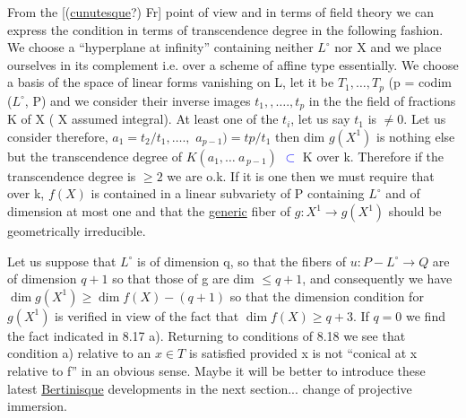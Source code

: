 \documentclass[11pt]{article}
\newcommand{\scanpage}[1]{\par\bigskip\noindent{\small\sffamily[scan #1]}\par}
\newcommand{\mspage}[1]{{\small\sffamily[p.\,#1]}}
\newcommand{\hand}[1]{\textcolor{blue}{#1}}
\newcommand{\uline}[1]{\underline{#1}}
\begin{document}
From the [(\uline{cunutesque}?) Fr] point of view and in terms of
field theory we can express the condition in terms of
transcendence degree in the following fashion.  We choose a
``hyperplane at infinity'' containing neither $L^{\circ}$ nor X and we place
ourselves in its complement i.e. over a scheme of affine type
essentially.  We choose a basis of the space of linear forms
vanishing on L, let it be $T_1, \ldots, T_p$ (p = codim ($L^{\circ}$, P) and we
consider their inverse images $t_1,, \ldots., t_p$ in the the field of
fractions K of X (  X assumed integral).  At least one of the $t_i$,
let us say $t_1$ is $\neq 0$.  Let us consider therefore, $a_1 = t_2/t_1, \ldots.,$
$a_{p-1}) = tp/t_1$ then dim $g(X^1)$ is nothing else but the transcendence
degree of $K(a_1, \ldots\ a_{\,p-1})$ \hand{$\subset$} K over k.  Therefore if the
transcendence degree is $\geq 2$ we are o.k.  If it is one then we must
require that over k, $f(X)$ is contained in a linear subvariety of P
containing $L^{\circ}$ and of dimension at most one and that the \uline{generic}
fiber of $g{:}X^1 \to g(X^1)$ should be geometrically irreducible.

\clearpage
\scanpage{24/62}
\mspage{62}

Let us suppose that $L^{\circ}$ is of dimension q, so that the fibers
of $u\colon P - L^{\circ} \to Q$ are of dimension $q + 1$ so that those of g are dim
$\leq q + 1$, and consequently we have $\dim g(X^{1}) \geq \dim f(X) - (q + 1)$ so
that the dimension condition for $g(X^{1})$ is verified in view of the
fact that $\dim f(X) \geq q + 3$. If $q = 0$ we find the fact indicated
in 8.17 a). Returning to conditions of 8.18 we see that condition
a) relative to an $x \in T$ is satisfied provided x is not ``conical at
x relative to f'' in an obvious sense. Maybe it will be better to
introduce these latest \uline{Bertinisque} developments in the next
section... change of projective immersion.

\clearpage
\scanpage{24/63}
\mspage{63}
\end{document}
